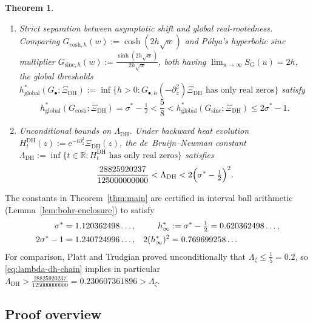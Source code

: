 \documentclass[11pt,a4paper,reqno]{amsart}
\newtheorem{theorem}{Theorem}[section]
\theoremstyle{definition}
\theoremstyle{remark}
\numberwithin{equation}{section}
\newcommand{\R}{\mathbb{R}}
\newcommand{\ee}{\mathrm{e}}
\begin{document}
\begin{theorem}
\begin{enumerate}[label=\textup{(\roman*)},leftmargin=2.2em]
\begin{enumerate}[label=\textup{(\alph*)},leftmargin=1.7em]
  \end{enumerate}
  \item \emph{Strict separation between asymptotic shift and global real-rootedness.} Comparing $G_{\mathrm{cosh},h}(w) := \cosh(2h\sqrt{w})$ and P\'olya's hyperbolic sinc multiplier $G_{\mathrm{sinc},h}(w) := \frac{\sinh(2h\sqrt{w})}{2h\sqrt{w}}$, both having $\lim_{u\to\infty} S_G(u) = 2h$, the global thresholds $h_{\mathrm{global}}^*(G_\bullet; \Xi_{\mathrm{DH}}) := \inf\{h > 0 : G_{\bullet,h}(-\partial_z^2)\Xi_{\mathrm{DH}} \text{ has only real zeros}\}$ satisfy
  \begin{equation}
    h_{\mathrm{global}}^*\!\left(G_{\mathrm{cosh}}; \Xi_{\mathrm{DH}}\right)
    = \sigma^* - \tfrac{1}{2}
    < \frac{5}{8}
    < h_{\mathrm{global}}^*\!\left(G_{\mathrm{sinc}}; \Xi_{\mathrm{DH}}\right)
    \le 2\sigma^* - 1.
    \label{eq:global-vs-asymp}
  \end{equation}
  \item \emph{Unconditional bounds on $\Lambda_{\mathrm{DH}}$.} Under backward heat evolution $H_t^{\mathrm{DH}}(z) := \ee^{-t\partial_z^2}\Xi_{\mathrm{DH}}(z)$, the de~Bruijn--Newman constant $\Lambda_{\mathrm{DH}} := \inf\{t \in \R : H_t^{\mathrm{DH}} \text{ has only real zeros}\}$ satisfies
  \begin{equation}
    \frac{28825920237}{125000000000}
    < \Lambda_{\mathrm{DH}}
    < 2\Bigl(\sigma^* - \tfrac{1}{2}\Bigr)^2.
    \label{eq:lambda-dh-chain}
  \end{equation}
\end{enumerate}
\end{theorem}

The constants in Theorem~\ref{thm:main} are certified in interval ball arithmetic (Lemma~\ref{lem:bohr-enclosure}) to satisfy
\begin{align}
  \sigma^* &= 1.120362498\ldots, &
  h_\infty^* &:= \sigma^* - \tfrac{1}{2} = 0.620362498\ldots, \notag\\
  2\sigma^* - 1 &= 1.240724996\ldots, &
  2(h_\infty^*)^2 &= 0.769699258\ldots
  \label{eq:canonical-params}
\end{align}
For comparison, Platt and Trudgian \cite{platt2021} proved unconditionally that $\Lambda_\zeta \le \frac{1}{5} = 0.2$, so \eqref{eq:lambda-dh-chain} implies in particular $\Lambda_{\mathrm{DH}} > \frac{28825920237}{125000000000} = 0.230607361896 > \Lambda_\zeta$.

\subsection{Proof overview}
\label{subsec:proof-overview}
\end{document}
